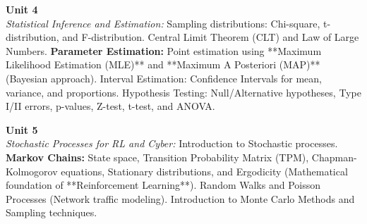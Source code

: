 \vspace{0.3cm}

\noindent\textbf{Unit 4} \\
\textit{Statistical Inference and Estimation:} Sampling distributions: Chi-square, t-distribution, and F-distribution. Central Limit Theorem (CLT) and Law of Large Numbers. \textbf{Parameter Estimation:} Point estimation using **Maximum Likelihood Estimation (MLE)** and **Maximum A Posteriori (MAP)** (Bayesian approach). Interval Estimation: Confidence Intervals for mean, variance, and proportions. Hypothesis Testing: Null/Alternative hypotheses, Type I/II errors, p-values, Z-test, t-test, and ANOVA.

\vspace{0.3cm}

\noindent\textbf{Unit 5} \\
\textit{Stochastic Processes for RL and Cyber:} Introduction to Stochastic processes. \textbf{Markov Chains:} State space, Transition Probability Matrix (TPM), Chapman-Kolmogorov equations, Stationary distributions, and Ergodicity (Mathematical foundation of **Reinforcement Learning**). Random Walks and Poisson Processes (Network traffic modeling). Introduction to Monte Carlo Methods and Sampling techniques.

\newpage
{}